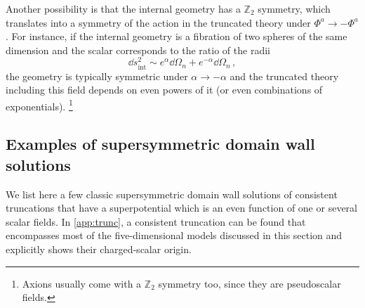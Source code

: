 Another possibility is that the internal geometry has a $\mathbb{Z}_2$ symmetry, which translates into a symmetry of the action in the truncated theory under $\Phi^a\to -\Phi^a$.
For instance, if the internal geometry is a fibration of two spheres of the same dimension and the scalar corresponds to the ratio of the radii
\begin{equation}
\dd s^2_{\text{int}}\sim e^{\alpha}\dd\Omega_n+e^{-\alpha} \dd\Omega_n\,,
\end{equation}
the geometry is typically symmetric under $\alpha\to -\alpha$ and the truncated theory including this field depends on even powers of it (or even combinations of exponentials).%
\footnote{
Axions usually come with a $\mathbb{Z}_2$ symmetry too, since they are pseudoscalar fields.
}

\subsection{Examples of supersymmetric domain wall solutions}
\label{sec:superpotential}

We list here a few classic supersymmetric domain wall solutions of consistent truncations that have a superpotential which is an even function of one or several scalar fields.
In \cref{app:trunc}, a consistent truncation can be found that encompasses most of the five-dimensional models discussed in this section and explicitly shows their charged-scalar origin. 

